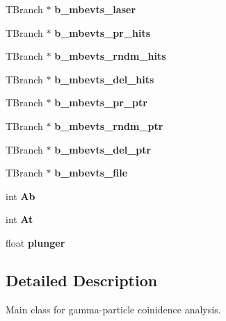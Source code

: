 \begin{DoxyCompactItemize}
T\+Branch $\ast$ {\bfseries b\+\_\+mbevts\+\_\+laser}
\item 
\mbox{\label{classg__clx_a65da8db31fa55fae0873a2e67a862bf7}} 
T\+Branch $\ast$ {\bfseries b\+\_\+mbevts\+\_\+pr\+\_\+hits}
\item 
\mbox{\label{classg__clx_a4c476be1f0e3227fce3ad74f91224929}} 
T\+Branch $\ast$ {\bfseries b\+\_\+mbevts\+\_\+rndm\+\_\+hits}
\item 
\mbox{\label{classg__clx_af8844a7d126f13b0932cf3d3ecce107b}} 
T\+Branch $\ast$ {\bfseries b\+\_\+mbevts\+\_\+del\+\_\+hits}
\item 
\mbox{\label{classg__clx_a249297b5ba9a24c75c59f6055e9fe061}} 
T\+Branch $\ast$ {\bfseries b\+\_\+mbevts\+\_\+pr\+\_\+ptr}
\item 
\mbox{\label{classg__clx_a7401209db4725c74c75d38e15a6b2d11}} 
T\+Branch $\ast$ {\bfseries b\+\_\+mbevts\+\_\+rndm\+\_\+ptr}
\item 
\mbox{\label{classg__clx_abb8b9787037a50733cc8f2efb64fadba}} 
T\+Branch $\ast$ {\bfseries b\+\_\+mbevts\+\_\+del\+\_\+ptr}
\item 
\mbox{\label{classg__clx_a59f6b47f4c944b311e6dd5a0abb103c5}} 
T\+Branch $\ast$ {\bfseries b\+\_\+mbevts\+\_\+file}
\item 
\mbox{\label{classg__clx_a3ecad3ddd660369644dafb28e0bfe26d}} 
int {\bfseries Ab}
\item 
\mbox{\label{classg__clx_a357526f9a06f3059124825bbf6c7a790}} 
int {\bfseries At}
\item 
\mbox{\label{classg__clx_aee52e53d2cd780936d648225402d8bcf}} 
float {\bfseries plunger}
\end{DoxyCompactItemize}


\subsection{Detailed Description}
Main class for gamma-\/particle coinidence analysis. 


